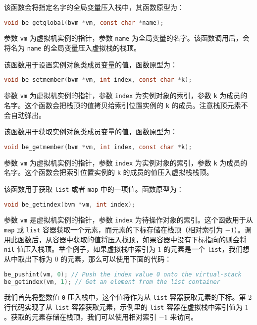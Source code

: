 
该函数会将指定名字的全局变量压入栈中，其函数原型为：
\begin{lstlisting}[language=c, style=berry, numbers=none]
void be_getglobal(bvm *vm, const char *name);
\end{lstlisting}
参数 \texttt{vm} 为虚拟机实例的指针，参数 \texttt{name} 为全局变量的名字。该函数调用后，会将名为 \texttt{name} 的全局变量压入虚拟栈的栈顶。


该函数用于设置实例对象类成员变量的值，函数原型为：
\begin{lstlisting}[language=c, style=berry, numbers=none]
void be_setmember(bvm *vm, int index, const char *k);
\end{lstlisting}
参数 \texttt{vm} 为虚拟机实例的指针，参数 \texttt{index} 为实例对象的索引，参数 \texttt{k} 为成员的名字。这个函数会把栈顶的值拷贝给索引位置实例的 \texttt{k} 的成员。注意栈顶元素不会自动弹出。


该函数用于获取实例对象类成员变量的值，函数原型为：
\begin{lstlisting}[language=c, style=berry, numbers=none]
void be_getmember(bvm *vm, int index, const char *k);
\end{lstlisting}
参数 \texttt{vm} 为虚拟机实例的指针，参数 \texttt{index} 为实例对象的索引，参数 \texttt{k} 为成员的名字。这个函数会把索引位置实例的 \texttt{k} 的成员的值压入虚拟栈栈顶。


该函数用于获取 \texttt{list} 或者 \texttt{map} 中的一项值。函数原型为：
\begin{lstlisting}[language=c, style=berry, numbers=none]
void be_getindex(bvm *vm, int index);
\end{lstlisting}
参数 \texttt{vm} 是虚拟机实例的指针，参数 \texttt{index} 为待操作对象的索引。这个函数用于从 \texttt{map} 或 \texttt{list} 容器获取一个元素，而元素的下标存储在栈顶（相对索引为 $-1$）。调用此函数后，从容器中获取的值将压入栈顶，如果容器中没有下标指向的则会将 \texttt{nil} 值压入栈顶。举个例子，如果虚拟栈中索引为 $1$ 的元素是一个 \texttt{list}，我们想从中取出下标为 $0$ 的元素，那么可以使用下面的代码：

\begin{lstlisting}[language=c, style=berry]
be_pushint(vm, 0); // Push the index value 0 onto the virtual-stack
be_getindex(vm, 1); // Get an element from the list container
\end{lstlisting}
我们首先将整数值 \texttt{0} 压入栈中，这个值将作为从 \texttt{list} 容器获取元素的下标。第 2 行代码实现了从 \texttt{list} 容器获取元素，示例里的 \texttt{list} 容器在虚拟栈中索引值为 $1$。获取的元素存储在栈顶，我们可以使用相对索引 $-1$ 来访问。


